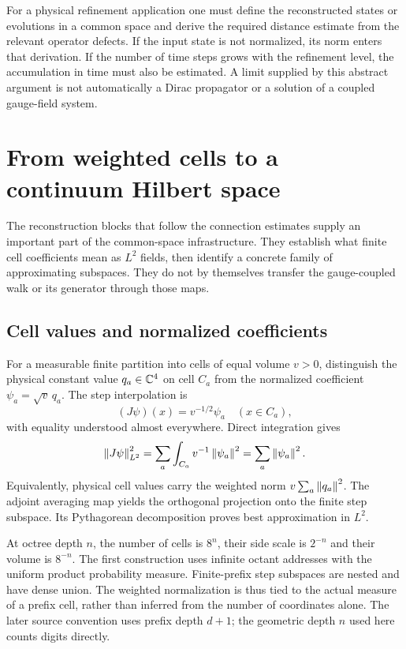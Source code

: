 For a physical refinement application one must define the reconstructed states or evolutions in a common space and derive the required distance estimate from the relevant operator defects. If the input state is not normalized, its norm enters that derivation. If the number of time steps grows with the refinement level, the accumulation in time must also be estimated. A limit supplied by this abstract argument is not automatically a Dirac propagator or a solution of a coupled gauge-field system.




\section{From weighted cells to a continuum Hilbert space}
\label{g:geometry-interface}
The reconstruction blocks that follow the connection estimates supply an important part of the common-space infrastructure. They establish what finite cell coefficients mean as $L^2$ fields, then identify a concrete family of approximating subspaces. They do not by themselves transfer the gauge-coupled walk or its generator through those maps.

\subsection{Cell values and normalized coefficients}
For a measurable finite partition into cells of equal volume $v>0$, distinguish the physical constant value $q_a\in\mathbb C^4$ on cell $C_a$ from the normalized coefficient $\psi_a=\sqrt v\,q_a$. The step interpolation is
\[
 (J\psi)(x)=v^{-1/2}\psi_a\quad(x\in C_a),
\]
with equality understood almost everywhere. Direct integration gives
\[
 \left\lVert J\psi\right\rVert_{L^2}^2
 =\sum_a\int_{C_a}v^{-1}\left\lVert\psi_a\right\rVert^2
 =\sum_a\left\lVert\psi_a\right\rVert^2.
\]
Equivalently, physical cell values carry the weighted norm $v\sum_a\left\lVert q_a\right\rVert^2$. The adjoint averaging map yields the orthogonal projection onto the finite step subspace. Its Pythagorean decomposition proves best approximation in $L^2$.

At octree depth $n$, the number of cells is $8^n$, their side scale is $2^{-n}$ and their volume is $8^{-n}$. The first construction uses infinite octant addresses with the uniform product probability measure. Finite-prefix step subspaces are nested and have dense union. The weighted normalization is thus tied to the actual measure of a prefix cell, rather than inferred from the number of coordinates alone. The later source convention  uses prefix depth $d+1$; the geometric depth $n$ used here counts digits directly.

